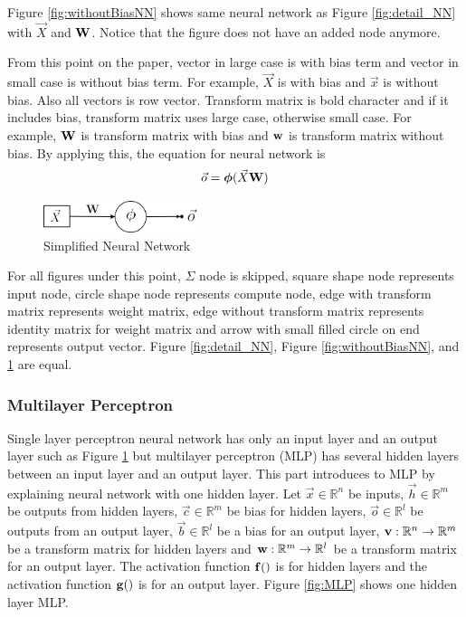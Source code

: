 \documentclass[draft,dvipsnames]{drexel-thesis}
\begin{document}
\begin{thesis}
Figure \ref{fig:withoutBiasNN} shows same neural network as Figure \ref{fig:detail_NN} with $\vec{X}$ and $\bold{W}$. Notice that the figure does not have an added node anymore.

	From this point on the paper, vector in large case is with bias term and vector in small case is without bias term. For example, $\vec{X}$ is with bias and $\vec{x}$ is without bias. Also all vectors is row vector. Transform matrix is bold character and if it includes bias, transform matrix uses large case, otherwise small case. For example, $\bold{W}$ is transform matrix with bias and $\bold{w}$ is transform matrix without bias. By applying this, the equation for neural network is
$$\vec{o} = \bm{\phi}(\vec{X}\bold{W})$$

\begin{figure}[t!]
    \centering
    \includegraphics[width=0.4\textwidth]{pictures/figures/NN.png}
    \caption{Simplified Neural Network}
    \label{fig:NN}
\end{figure}

	For all figures under this point, $\Sigma$ node is skipped, square shape node represents input node, circle shape node represents compute node, edge with transform matrix represents weight matrix, edge without transform matrix represents identity matrix for weight matrix and arrow with small filled circle on end represents output vector. Figure \ref{fig:detail_NN}, Figure \ref{fig:withoutBiasNN}, and \ref{fig:NN} are equal.


\subsubsection{Multilayer Perceptron}\label{subsubsec:MLP}
Single layer perceptron neural network has only an input layer and an output layer such as Figure \ref{fig:NN} but multilayer perceptron (MLP) has several hidden layers between an input layer and an output layer. This part introduces to MLP by explaining neural network with one hidden layer. Let $\vec{x} \in \mathbb{R}^n$ be inputs, $\vec{h} \in \mathbb{R}^m$ be outputs from hidden layers, $\vec{c} \in \mathbb{R}^m$ be bias for hidden layers, $\vec{o} \in \mathbb{R}^l$ be outputs from an output layer, $\vec{b} \in \mathbb{R}^l$ be a bias for an output layer, $\bold{v}: \mathbb{R}^n \rightarrow \mathbb{R}^m$ be a transform matrix for hidden layers and $\bold{w}: \mathbb{R}^m \rightarrow \mathbb{R}^l$ be a transform matrix for an output layer. The activation function $\bold{f}()$ is for hidden layers and the activation function $\bold{g}()$ is for an output layer. Figure \ref{fig:MLP} shows one hidden layer MLP.


\end{thesis}
\end{document}
